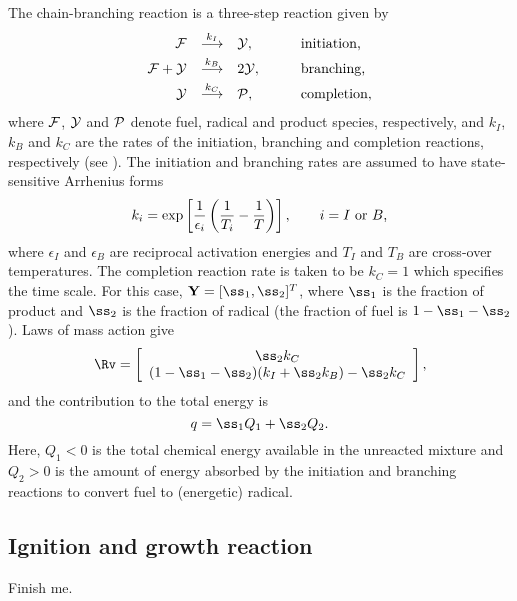 \documentclass{article}
\begin{document}
The chain-branching reaction is a three-step reaction given by
\[
\begin{array}{rcll}
{\cal F}&\buildrel k_I\over\longrightarrow&{\cal Y}, & \qquad\hbox{initiation,}\smallskip\\
{\cal F}+{\cal Y}&\buildrel k_B\over\longrightarrow&2{\cal Y}, & \qquad\hbox{branching,}\smallskip\\
{\cal Y}&\buildrel k_C\over\longrightarrow&{\cal P},  & \qquad\hbox{completion,}
\end{array}
\]
where ${\cal F}$, ${\cal Y}$ and ${\cal P}$ denote fuel, radical and product
species, respectively, and $k_I$, $k_B$ and $k_C$ are the rates of the
initiation, branching and completion reactions, respectively (see
\cite{ShortKapilaQuirk99}).  The initiation and branching rates are assumed to have
state-sensitive Arrhenius forms
\begin{equation}
k_i=\exp\left[{1\over\epsilon_i}\left({1\over T_i}-{1\over T}\right)\right],
\qquad\hbox{$i=I$ or $B$,}
\label{eq:chainBranchingRates}
\end{equation}
where $\epsilon_I$ and $\epsilon_B$ are reciprocal activation energies and $T_I$
and $T_B$ are cross-over temperatures.  The completion reaction rate is taken to
be $k_C=1$ which specifies the time scale.  For this case, $\bs=[\ss_1,\ss_2]^T$, 
where $\ss_1$ is the fraction of product and $\ss_2$ is the fraction of radical
(the fraction of fuel is $1-\ss_1-\ss_2$).  Laws of mass action give
\begin{equation}
\Rv = \left[
\begin{array}{c}
\ss_2k_C \\
(1-\ss_1-\ss_2)(k_I+\ss_2k_B)-\ss_2k_C
\end{array}\right],
\label{eq:chainBranching}
\end{equation}
and the contribution to the total energy is
\[
q=\ss_1Q_1+\ss_2Q_2.
\]
Here, $Q_1<0$ is the total chemical energy available in the unreacted mixture
and $Q_2>0$ is the amount of energy absorbed by the initiation and branching
reactions to convert fuel to (energetic) radical.


\subsection{Ignition and growth reaction} \label{sec:ignitionAndGrowth}

Finish me.
\end{document}

